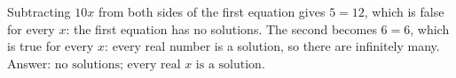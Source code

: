 Subtracting $10x$ from both sides of the first equation gives $5=12$, which is false for every $x$: the first equation has no solutions. The second becomes $6=6$, which is true for every $x$: every real number is a solution, so there are infinitely many. Answer: $\boxed{\text{no solutions; every real }x\text{ is a solution}}$.
